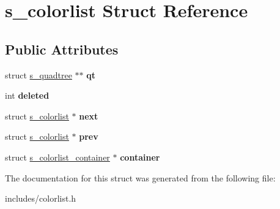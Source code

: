 \hypertarget{structs__colorlist}{}\section{s\+\_\+colorlist Struct Reference}
\label{structs__colorlist}
\subsection*{Public Attributes}
\begin{DoxyCompactItemize}
\item 
\mbox{\label{structs__colorlist_a35d1a0b3b3ac0bc7204624aab07822ad}} 
struct \hyperlink{structs__quadtree}{s\+\_\+quadtree} $\ast$$\ast$ {\bfseries qt}
\item 
\mbox{\label{structs__colorlist_a3d7d01843eaa6efb784b31be97b75c19}} 
int {\bfseries deleted}
\item 
\mbox{\label{structs__colorlist_a13780b472288d75d8b0ec18c68993d83}} 
struct \hyperlink{structs__colorlist}{s\+\_\+colorlist} $\ast$ {\bfseries next}
\item 
\mbox{\label{structs__colorlist_aee391d85f9bcb87f54e7dc3f7aad6210}} 
struct \hyperlink{structs__colorlist}{s\+\_\+colorlist} $\ast$ {\bfseries prev}
\item 
\mbox{\label{structs__colorlist_a09c6f78f674501b36d873ffd6e667747}} 
struct \hyperlink{structs__colorlist__container}{s\+\_\+colorlist\+\_\+container} $\ast$ {\bfseries container}
\end{DoxyCompactItemize}


The documentation for this struct was generated from the following file\+:\begin{DoxyCompactItemize}
\item 
includes/colorlist.\+h\end{DoxyCompactItemize}
